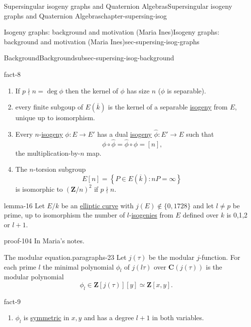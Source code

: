 \documentclass[oneside,10pt,]{book}
\numberwithin{equation}{section}
\newcommand{\lb}{[}
\newcommand{\rb}{]}
\newcommand{\ZZ}{\mathbf{Z}}
\newcommand{\CC}{\mathbf{C}}
\begin{document}
\begin{chapterptx}{Supersingular isogeny graphs and Quaternion Algebras}{}{Supersingular isogeny graphs and Quaternion Algebras}{}{}{chapter-supersing-isog}
\begin{sectionptx}{Isogeny graphs: background and motivation (Maria Ines)}{}{Isogeny graphs: background and motivation (Maria Ines)}{}{}{sec-supersing-isog-graphs}
\begin{subsectionptx}{Background}{}{Background}{}{}{subsec-supersing-isog-background}
\begin{fact}{}{}{fact-8}
\begin{enumerate}
\item\hypertarget{li-184}{}If \(p \nmid n = \deg \phi\) then the kernel of \(\phi\) has size \(n\) (\(\phi\) is separable).%
\item\hypertarget{li-185}{}every finite subgoup of \(E(\overline k )\) is the kernel of a separable \hyperref[def-supersing-isog-isog]{isogeny} from \(E\), unique up to isomorphism.%
\item\hypertarget{li-186}{}Every \(n\)-\hyperref[def-supersing-isog-isog]{isogeny} \(\phi\colon E \to E'\) has  a dual \hyperref[def-supersing-isog-isog]{isogeny} \(\hat \phi \colon E' \to E\) such that%
\begin{equation*}
\phi\circ \hat\phi = \hat\phi \circ \phi = \lb n \rb\text{,}
\end{equation*}
the multiplication-by-\(n \) map.%
\item\hypertarget{li-187}{}The \(n\)-torsion subgroup%
\begin{equation*}
E\lb n \rb = \left\{ P \in E(\overline k) : nP = \infty\right\}
\end{equation*}
is isomorphic to \((\ZZ/n)^2\) if \(p\nmid n\).%
\end{enumerate}
%
\end{fact}
\begin{lemma}{}{}{lemma-16}%
\hypertarget{p-793}{}%
Let \(E/k\) be an \hyperref[def-supersing-isog-ec]{elliptic curve} with \(j(E) \not\in\{0,1728\}\) and let \(l\ne p\) be prime, up to isomorphism the number of \(l\)-\hyperref[def-supersing-isog-isog]{isogenies} from \(E\) defined over \(k\) is 0,1,2 or \(l+1\).%
\end{lemma}
\begin{proofptx}{}{proof-104}
\hypertarget{p-794}{}%
In Maria's notes.%
\end{proofptx}
\begin{paragraphs}{The modular equation.}{paragraphs-23}%
\hypertarget{p-795}{}%
Let \(j(\tau)\) be the modular \(j\)-function. For each prime \(l\) the minimal polynomial \(\phi_l\) of \(j(l\tau)\) over \(\CC (j(\tau))\) is the modular polynomial%
\begin{equation*}
\phi_l \in \ZZ[j(\tau)][y] \simeq \ZZ[x,y]\text{.}
\end{equation*}
%
\begin{fact}{}{}{fact-9}%
\hypertarget{p-796}{}%
\leavevmode%
\begin{enumerate}
\item\hypertarget{li-188}{}\(\phi_l\) is \hyperref[def-princ-pol]{symmetric} in \(x,y\) and has a degree \(l+1\) in both variables.%

\end{enumerate}
\end{fact}
\end{paragraphs}
\end{subsectionptx}
\end{sectionptx}
\end{chapterptx}
\end{document}
